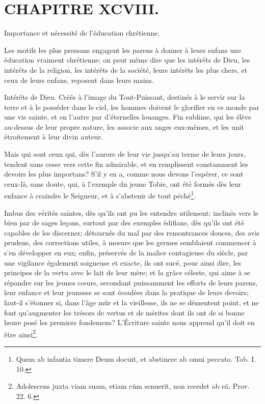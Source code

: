 \documentclass[instructions.tex]{subfiles}
\begin{document}
 
\chapter{CHAPITRE XCVIII.}
 
Importance et nécessité de l'éducation chrétienne.
 
Les motifs les plus pressans engagent les parens à donner à leurs enfans une éducation vraiment chrétienne; on peut même dire que les intérêts de Dieu, les intérêts de la religion, les intérêts de la société, leurs intérêts les plus chers, et ceux de leurs enfans, reposent dans leurs mains.
 
\primo Intérêts de Dieu. Créés à l'image du Tout-Puissant, destinés à le servir sur la terre et à le posséder dans le ciel, les hommes doivent le glorifier en ce monde par une vie sainte, et en l'autre par d'éternelles louanges. Fin sublime, qui les élève au-dessus de leur propre nature, les associe aux anges eux-mêmes, et les unit étroitement à leur divin auteur.
 
Mais qui sont ceux qui, dès l'aurore de leur vie jusqu'au terme de leurs jours, tendent sans cesse vers cette fin admirable, et en remplissent constamment les devoirs les plus importans? S'il y en a, comme nous devons l'espérer, ce sont ceux-là, sans doute, qui, à l'exemple du jeune Tobie, ont été formés dès leur enfance à craindre le Seigneur, et à s'abstenir de tout péché\footnote{Quem ab infantia timere Deum docuit, et abstinere ab omni peccato. Tob. I. 10.}.
 
Imbus des vérités saintes, dès qu'ils ont pu les entendre utilement; inclinés vers le bien par de sages leçons, surtout par des exemples édifians, dès qu'ils ont été capables de les discerner; détournés du mal par des remontrances douces, des avis prudens, des corrections utiles, à mesure que les germes semblaient commencer à s'en développer en eux; enfin, préservés de la malice contagieuse du siècle, par une vigilance également soigneuse et exacte, ils ont sucé, pour ainsi dire, les principes de la vertu avec le lait de leur mère; et la grâce céleste, qui aime à se répandre sur les jeunes cœurs, secondant puissamment les efforts de leurs parens, leur enfance et leur jeunesse se sont écoulées dans la pratique de leurs devoirs; faut-il s'étonner si, dans l'âge mûr et la vieillesse, ils ne se démentent point, et ne font qu'augmenter les trésors de vertus et de mérites dont ils ont de si bonne heure posé les premiers fondemens? L'Écriture sainte nous apprend qu'il doit en être ainsi\footnote{Adolescens juxta viam suam, etiam cùm senuerit, non recedet ab eâ. Prov. 22. 6.}.
 
\end{document}

